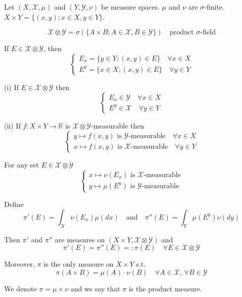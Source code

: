 \begin{theorem}
    Let \((X, \mathcal{X}, \mu)\) and \((Y, \mathcal{Y}, \nu)\) be measure spaces. \(\mu\) and \(\nu\) are \(\sigma\)-finite. \(X \times Y = \{(x,y); x \in X, y \in Y\}\).

\[
\mathcal{X} \otimes \mathcal{Y} = \sigma(\{A \times B; A \in \mathcal{X}, B \in \mathcal{Y}\}) \quad \text{product \(\sigma\)-field}
\]

If \(E \in \mathcal{X} \otimes \mathcal{Y}\), then
\[
\begin{cases} 
E_x = \{y \in Y; (x,y) \in E\} \quad \forall x \in X \\
E^y = \{x \in X; (x,y) \in E\} \quad \forall y \in Y
\end{cases}
\]
\end{theorem} 



\begin{proposition}
(i) If \( E \in \mathcal{X} \otimes \mathcal{Y} \) then 
\[
\begin{cases}
E_x \in \mathcal{Y} \quad \forall x \in X \\
E^y \in \mathcal{X} \quad \forall y \in Y
\end{cases}
\]

(ii) If \( f: X \times Y \rightarrow \mathbb{R} \) is \(\mathcal{X} \otimes \mathcal{Y}\)-measurable then
\[
\begin{cases}
y \mapsto f(x,y) \text{ is } \mathcal{Y}\text{-measurable} \quad \forall x \in X \\
x \mapsto f(x,y) \text{ is } \mathcal{X}\text{-measurable} \quad \forall y \in Y
\end{cases}
\]
\end{proposition}


\begin{proposition}
For any set \( E \in \mathcal{X} \otimes \mathcal{Y} \)
\[
\begin{cases}
x \mapsto \nu(E_x) \text{ is } \mathcal{X}\text{-measurable} \\
y \mapsto \mu(E^y) \text{ is } \mathcal{Y}\text{-measurable}
\end{cases}
\]

Define
\[
\pi'(E) = \int_X \nu(E_x) \mu(dx) \quad \text{and} \quad \pi''(E) = \int_Y \mu(E^y) \nu(dy)
\]

Then \(\pi'\) and \(\pi''\) are measures on \((X \times Y, \mathcal{X} \otimes \mathcal{Y})\) and
\[
\pi'(E) = \pi''(E) =: \pi(E) \quad \forall E \in \mathcal{X} \otimes \mathcal{Y}
\]

Moreover, \(\pi\) is the only measure on \(X \times Y\) s.t.
\[
\pi(A \times B) = \mu(A) \cdot \nu(B) \quad \forall A \in \mathcal{X}, \, \forall B \in \mathcal{Y}
\]

We denote \(\pi = \mu \times \nu\) and we say that \(\pi\) is the product measure.
\end{proposition}


